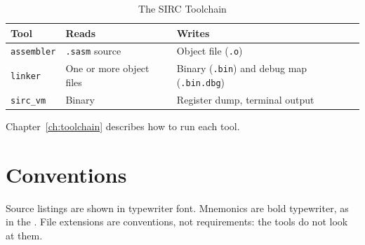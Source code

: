 \begin{table}[H]
	\centering
	\begin{tabular}{lll}
		\toprule
		\textbf{Tool}      & \textbf{Reads}           & \textbf{Writes}                                          \\
		\midrule
		\texttt{assembler} & \texttt{.sasm} source    & Object file (\texttt{.o})                                \\
		\texttt{linker}    & One or more object files & Binary (\texttt{.bin}) and debug map (\texttt{.bin.dbg}) \\
		\texttt{sirc\_vm}  & Binary                   & Register dump, terminal output                           \\
		\bottomrule
	\end{tabular}
	\caption{The SIRC Toolchain}
	\label{tab:toolchain}
\end{table}

Chapter~\ref{ch:toolchain} describes how to run each tool.

\section{Conventions}

Source listings are shown in typewriter font. Mnemonics are bold typewriter, as in the \archmanual{}. File extensions
are conventions, not requirements: the tools do not look at them.
